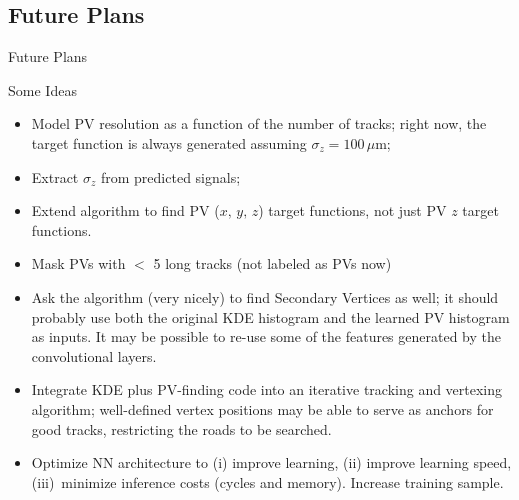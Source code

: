 \subsection{Future Plans}
\begin{frame}{Future Plans}
\vskip -0.10in
  \begin{block}{Some Ideas}
    \begin{itemize}
        \item 
          Model PV resolution as a function of the number of tracks; right now, the target
          function is always generated assuming $ \sigma_z = 100 \, \mu $m;
        \item
          Extract $ \sigma_z $ from predicted signals;
        \item
          Extend algorithm to find PV ($ x, \, y, \, z $) target functions,
          not just PV $ z $ target functions.
        \item 
        \textcolor{brickred}{Mask PVs with $ < $ 5 long tracks (not labeled as PVs  now)} 
        \item
          Ask the algorithm (very nicely) to find Secondary Vertices as well;
          it should probably use both the original KDE histogram and the 
          learned PV histogram as inputs.
          It may be possible to re-use some of the features generated by the 
          convolutional layers.
        \item
          Integrate  KDE plus PV-finding code into an iterative tracking and vertexing
          algorithm; well-defined vertex positions may be able to serve as anchors for 
          good tracks, restricting the roads to be searched.  
        \item
          Optimize NN architecture to (i) improve learning, (ii) improve learning speed,
          (iii)~minimize inference costs (cycles and memory).
          Increase training sample.
   \end{itemize}
  \end{block}
\end{frame}


